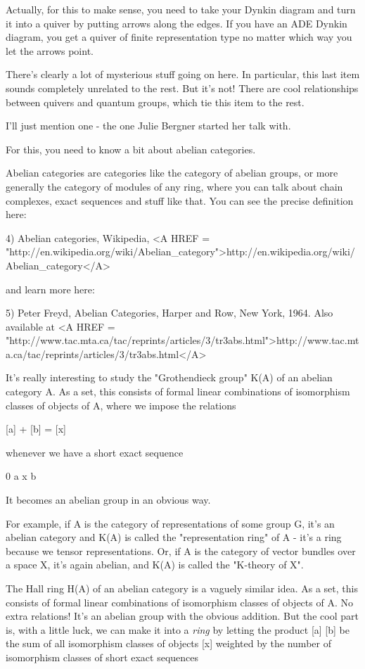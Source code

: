 Actually, for this to make sense, you need to take your Dynkin diagram
and turn it into a quiver by putting arrows along the edges.  If you
have an ADE Dynkin diagram, you get a quiver of finite representation
type no matter which way you let the arrows point.

There's clearly a lot of mysterious stuff going on here.  In
particular, this last item sounds completely unrelated to the 
rest.  But it's not!  There are cool relationships between quivers
and quantum groups, which tie this item to the rest.

I'll just mention one - the one Julie Bergner started her talk with.

For this, you need to know a bit about abelian categories.

Abelian categories are categories like the category of abelian groups,
or more generally the category of modules of any ring, where you can 
talk about chain complexes, exact sequences and stuff like that.  
You can see the precise definition here:

4) Abelian categories, Wikipedia, 
<A HREF = "http://en.wikipedia.org/wiki/Abelian_category">http://en.wikipedia.org/wiki/Abelian_category</A>

and learn more here:

5) Peter Freyd, Abelian Categories, Harper and Row, New York, 1964.
Also available at <A HREF = "http://www.tac.mta.ca/tac/reprints/articles/3/tr3abs.html">http://www.tac.mta.ca/tac/reprints/articles/3/tr3abs.html</A>

It's really interesting to study the "Grothendieck group" K(A) of an 
abelian category A.  As a set, this consists of formal linear combinations 
of isomorphism classes of objects of A, where we impose the relations

[a] + [b] = [x]

whenever we have a short exact sequence

0 \to  a \to  x \to  b 

It becomes an abelian group in an obvious way.

For example, if A is the category of representations of some group G, 
it's an abelian category and K(A) is called the "representation ring" 
of A - it's a ring because we tensor representations.  Or, if A is the 
category of vector bundles over a space X, it's again abelian, and K(A) 
is called the "K-theory of X".  

The Hall ring H(A) of an abelian category is a vaguely similar idea.
As a set, this consists of formal linear combinations of isomorphism
classes of objects of A.  No extra relations!  It's an abelian group 
with the obvious addition.  But the cool part is, with a little luck, 
we can make it into a \emph{ring} by letting the product [a] [b] be the 
sum of all isomorphism classes of objects [x] weighted by the number 
of isomorphism classes of short exact sequences

